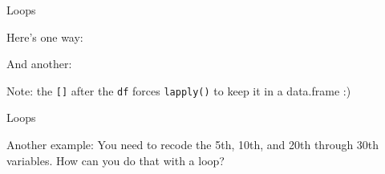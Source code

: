 \begin{frame}[fragile]{Loops}

Here's one way:

\begin{Shaded}
\begin{Highlighting}[]
\StringTok{ }\NormalTok{)}
\end{Highlighting}
\end{Shaded}

And another:

\begin{Shaded}
\begin{Highlighting}[]
\StringTok{ }\OperatorTok{==}\StringTok{ }\NormalTok{, }
\end{Highlighting}
\end{Shaded}

\vspace{20pt}

Note: the \texttt{{[}{]}} after the \texttt{df} forces \texttt{lapply()}
to keep it in a data.frame :)

\end{frame}

\begin{frame}{Loops}

\begin{block}{Another example: You need to recode the 5th, 10th, and
20th through 30th variables. How can you do that with a loop?}

\end{block}

\end{frame}

